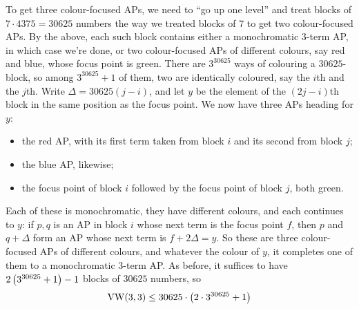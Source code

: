 To get three colour-focused APs, we need to ``go up one level'' and treat blocks of $7 \cdot 4375 = 30625$ numbers the way we treated blocks of $7$ to get two colour-focused APs. By the above, each such block contains either a monochromatic $3$-term AP, in which case we're done, or two colour-focused APs of different colours, say red and blue, whose focus point is green. There are $3^{30625}$ ways of colouring a $30625$-block, so among $3^{30625} + 1$ of them, two are identically coloured, say the $i$th and the $j$th. Write $\Delta = 30625(j - i)$, and let $y$ be the element of the $(2j - i)$th block in the same position as the focus point. We now have three APs heading for $y$:
\begin{itemize}
    \item the red AP, with its first term taken from block $i$ and its second from block $j$;
    \item the blue AP, likewise;
    \item the focus point of block $i$ followed by the focus point of block $j$, both green.
\end{itemize}

\begin{figure}[H] %
    \centering
\end{figure}

Each of these is monochromatic, they have different colours, and each continues to $y$: if $p, q$ is an AP in block $i$ whose next term is the focus point $f$, then $p$ and $q + \Delta$ form an AP whose next term is $f + 2\Delta = y$. So these are three colour-focused APs of different colours, and whatever the colour of $y$, it completes one of them to a monochromatic $3$-term AP. As before, it suffices to have $2\left( 3^{30625} + 1 \right) - 1$ blocks of $30625$ numbers, so
\begin{align*}
    \operatorname{VW}(3, 3) \leq 30625 \cdot \left( 2 \cdot 3^{30625} + 1 \right)
\end{align*}

